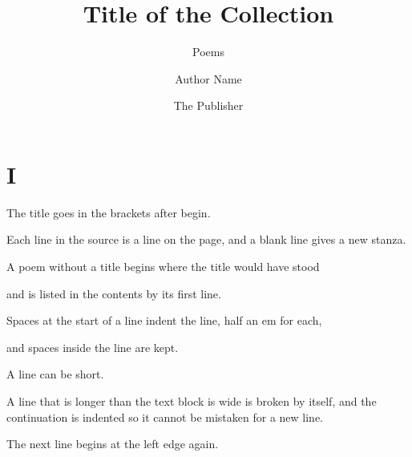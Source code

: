 \documentclass[12pt,twoside]{book}
\begin{document}
\title{Title of the Collection}
\subtitle{Poems}
\author{Author Name}
\date{The Publisher}




\booktitlepage



\poemtoc


%

\part{I}

\begin{poem}
The title goes in the brackets
after begin.

Each line in the source
is a line on the page,
and a blank line
gives a new stanza.
\end{poem}

\begin{poem}
A poem without a title
begins where the title would have stood

and is listed in the contents
by its first line.
\end{poem}

\begin{poem}[Indentation]
Spaces at the start of a line
    indent the line,
        half an em for each,

and spaces   inside the line   are kept.
\end{poem}

\begin{poem}
A line can be short.

A line that is longer than the text block is wide is broken by itself, and the continuation is indented so it cannot be mistaken for a new line.

The next line begins at the left edge again.
\end{poem}
\end{document}
